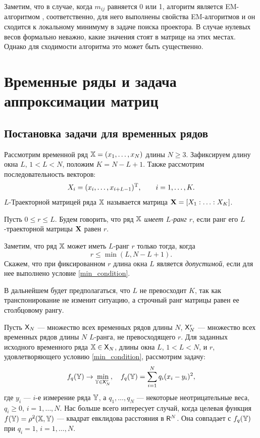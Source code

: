 \documentclass[12pt,a4paper,fleqn,leqno]{article}
\begin{document}
Заметим, что в случае, когда $m_{ij}$ равняется 0 или 1, алгоритм является EM-алгоритмом \cite{Srebro2003},
соответственно, для него выполнены свойства EM-алгоритмов и он сходится к локальному минимуму в задаче поиска проектора.
В случае нулевых весов формально неважно, какие значения стоят в матрице на этих местах. Однако для сходимости алгоритма
это может быть существенно.

\section{Временные ряды и задача аппроксимации матриц}
\label{sec:ts_matrices}
\subsection{Постановка задачи для временных рядов}
Рассмотрим временной ряд $\mathbb{X} = (x_1, \ldots, x_N)$ длины $N \ge 3$. Зафиксируем длину окна $L$, $1 < L < N$, положим $K = N - L + 1$. Также рассмотрим последовательность векторов:
\begin{equation}\label{l_lagged}
X_i = (x_i, \ldots, x_{i + L - 1})^{\mathrm{T}}, \qquad i = 1, \ldots, K.
\end{equation}
$L$-Траекторной матрицей ряда $\mathbb{X}$ называется матрица $\mathbf{X} = [X_1:\ldots:X_K]$.

\begin{definition}
Пусть $0 \le r \le L$. Будем говорить, что ряд $\mathbb{X}$ \emph{имеет $L$-ранг $r$}, если ранг его $L$-траекторной матрицы $\mathbf{X}$ равен $r$.
\end{definition}

Заметим, что ряд $\mathbb{X}$ может иметь $L$-ранг $r$ только тогда, когда
\begin{equation}
r \le \min(L, N-L+1). \label{min_condition}
\end{equation}
Скажем, что при фиксированном $r$ длина окна $L$ является \emph{допустимой}, если для нее выполнено условие \eqref{min_condition}.

В дальнейшем будет предполагаться, что $L$ не превосходит $K$, так как транспонирование не изменит ситуацию, а строчный ранг матрицы равен ее столбцовому рангу.

Пусть $\mathsf{X}_N$ --- множество всех временных рядов длины $N$, $\mathsf{X}_N^r$ --- множество всех временных рядов длины $N$ $L$-ранга, не превосходящего $r$. Для заданных исходного временного ряда $\mathbb{X} \in \mathsf{X}_N$, длины окна $L$, $1 < L < N$, и $r$, удовлетворяющего условию \eqref{min_condition}, рассмотрим задачу:
\begin{equation} \label{L-rank_task}
f_q(\mathbb{Y}) \to \min_{\mathbb{Y} \in \mathsf{X}_N^r}, \quad f_q(\mathbb{Y}) = \sum \limits_{i=1}^N q_i(x_i - y_i)^2,
\end{equation}
где $y_i$ --- $i$-е измерение ряда $\mathbb{Y}$, а $q_1, \ldots, q_N$ --- некоторые неотрицательные веса,
$q_i \ge 0$, $i = 1, \ldots, N$. Нас больше всего интересует случай, когда целевая функция $f(\mathbb{Y}) = \rho^2(\mathbb{X}, \mathbb{Y})$ --- квадрат евклидова расстояния в $\mathsf{R}^N$. Она совпадает с $f_q(\mathbb{Y})$ при $q_i = 1$, $i = 1, \ldots, N$.
\end{document}
